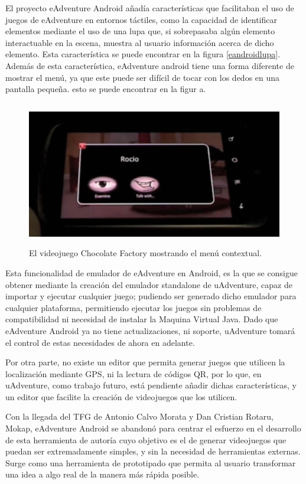 El proyecto eAdventure Android añadía características que facilitaban el uso de juegos de eAdventure en entornos táctiles, como la capacidad de identificar elementos mediante el uso de una lupa que, si sobrepasaba algún elemento interactuable en la escena, muestra al usuario información acerca de dicho elemento. Esta característica se puede encontrar en la figura \ref{eandroidlupa}. Además de esta característica, eAdventure android tiene una forma diferente de mostrar el menú, ya que este puede ser difícil de tocar con los dedos en una pantalla pequeña. esto se puede encontrar en la figur a\label{eandroidmenu}.

\begin{figure}[htb]
	\centerline{\includegraphics[height=2.5in]{figures/eandroid-menu.png}}
	\caption[eAdventure Android - Menu]{El videojuego Chocolate Factory mostrando el menú contextual.}
	\label{eandroidmenu}
\end{figure}

Esta funcionalidad de emulador de eAdventure en Android, es la que se consigue obtener mediante la creación del emulador standalone de uAdventure, capaz de importar y ejecutar cualquier juego; pudiendo ser generado dicho emulador para cualquier plataforma, permitiendo ejecutar los juegos sin problemas de compatibilidad ni necesidad de instalar la Maquina Virtual Java. Dado que eAdventure Android ya no tiene actualizaciones, ni soporte, uAdventure tomará el control de estas necesidades de ahora en adelante.

Por otra parte, no existe un editor que permita generar juegos que utilicen la localización mediante GPS, ni la lectura de códigos QR, por lo que, en uAdventure, como trabajo futuro, está pendiente añadir dichas características, y un editor que facilite la creación de videojuegos que los utilicen. 

Con la llegada del TFG de Antonio Calvo Morata y Dan Cristian Rotaru, Mokap, eAdventure Android se abandonó para centrar el esfuerzo en el desarrollo de esta herramienta de autoría cuyo objetivo es el de generar videojuegos que puedan ser extremadamente simples, y sin la necesidad de herramientas externas. Surge como una herramienta de prototipado que permita al usuario transformar una idea a algo real de la manera más rápida posible.

